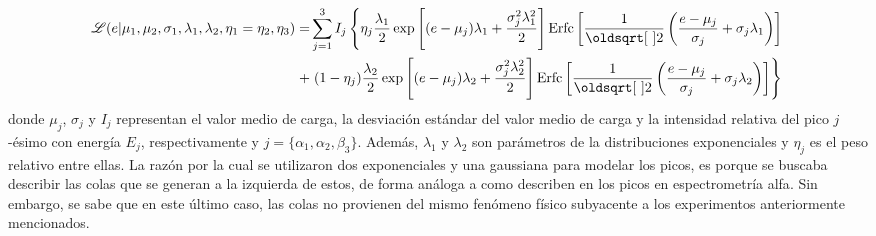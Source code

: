 {\small
\begin{align}
    \Lagr(e|\mu_{1},
            \mu_{2},
            \sigma_{1},
            \lambda_{1},
            \lambda_{2},
            \eta_{1} = \eta_{2},
            \eta_{3})
    = &
    \sum\limits_{j=1}^{3} I_{j}
    \left\{
        \eta_{j}\frac{\lambda_{1}}{2}
        \exp
            \left[
                (e-\mu_{j})\lambda_{1} + \frac{\sigma_{j}^{2}\lambda_{1}^{2}}{2}
            \right]
        \mbox{Erfc}
        \left[
            \frac{1}{\sqrt{2}}
            \left(
                \frac{e - \mu_{j}}{\sigma_{j}}
                +\sigma_{j}\lambda_{1}
            \right)
        \right] \right. \nonumber
        \\
        + &
        \left.
        (1-\eta_{j})\frac{\lambda_{2}}{2}
        \exp
            \left[
                 (e - \mu_{j})\lambda_{2}
                 + \frac{\sigma_{j}^{2}\lambda_{2}^{2}}{2}
            \right]
        \mbox{Erfc}
        \left[
            \frac{1}{\sqrt{2}}
            \left(
                \frac{e - \mu_{j}}{\sigma_{j}}
                +\sigma_{j}\lambda_{2}
            \right)
        \right]
    \right\}
        \label{ec:verosimilitud}
\end{align}
}%
donde $\mu_{j}$, $\sigma_{j}$ y $I_{j}$ representan el valor medio de carga, la desviación estándar del valor medio de carga y la intensidad relativa del pico $j$-ésimo con energía $E_{j}$, respectivamente y $j = \{\alpha_{1}, \alpha_{2}, \beta_{3}\}$. Además, $\lambda_{1}$ y $\lambda_{2}$ son parámetros de la distribuciones exponenciales y $\eta_{j}$ es el peso relativo entre ellas. La razón por la cual se utilizaron dos exponenciales y una gaussiana para modelar los picos, es porque se buscaba describir las colas que se generan a la izquierda de estos, de forma análoga a como describen en los picos en espectrometría alfa\cite{Bortels}. Sin embargo, se sabe que en este último caso, las colas no provienen del mismo fenómeno físico subyacente a los experimentos anteriormente mencionados.
